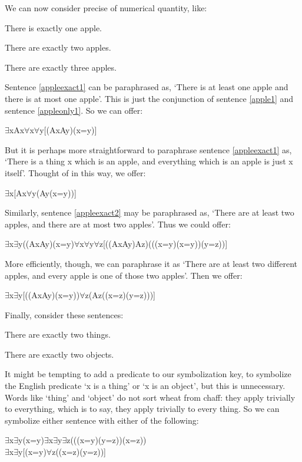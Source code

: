 We can now consider precise of numerical quantity, like:
\begin{earg}
\item[\ex{appleexact1}]There is exactly one apple.
\item[\ex{appleexact2}]There are exactly two apples.
\item[\ex{appleexact3}]There are exactly three apples.
\end{earg}
Sentence \ref{appleexact1} can be paraphrased as, ‘There is at least one apple and there is at most one apple’. This is just the conjunction of sentence \ref{apple1} and sentence \ref{appleonly1}. So we can offer:
\begin{center}
$\exists$xAx\eand $\forall$x$\forall$y[(Ax\eand Ay)\eif (x=y)]
\end{center}
But it is perhaps more straightforward to paraphrase sentence \ref{appleexact1} as, ‘There is a thing x which is an apple, and everything which is an apple is just x itself’. Thought of in this way, we offer:
\begin{center}
$\exists$x[Ax\eand $\forall$y(Ay\eif (x=y))]
\end{center}
Similarly, sentence \ref{appleexact2} may be paraphrased as, ‘There are at least two apples, and there are at most two apples’. Thus we could offer:
\begin{center}
$\exists$x$\exists$y((Ax\eand Ay)\eand \enot (x=y)\eand $\forall$x$\forall$y$\forall$z[((Ax\eand Ay)\eand Az)\eif (((x=y)\eor (x=y))\eor (y=z))]
\end{center}
More efficiently, though, we can paraphrase it as ‘There are at least two different apples, and every apple is one of those two apples’. Then we offer:
\begin{center}
$\exists$x$\exists$y[︁((Ax\eand Ay)\eand \enot (x=y))\eand $\forall$z(Az\eif ((x=z)\eor (y=z)))]︁
\end{center}
Finally, consider these sentences:
\begin{earg}
\item[\ex{twothings}] There are exactly two things.
\item[\ex{twoobjects}] There are exactly two objects.
\end{earg}
It might be tempting to add a predicate to our symbolization key, to symbolize the English predicate ‘x is a thing’ or ‘x is an object’, but this is unnecessary. Words like ‘thing’ and ‘object’ do not sort wheat from chaff: they apply trivially to everything, which is to say, they apply trivially to every thing. So we can symbolize either sentence with either of the following:
\begin{center}
$\exists$x$\exists$y\enot (x=y)\eand \enot $\exists$x$\exists$y$\exists$z((\enot (x=y)\eand \enot (y=z))\eand \enot (x=z))\\
$\exists$x$\exists$y[︁\enot (x=y)\eand $\forall$z((x=z)\eor (y=z))]
\end{center}
